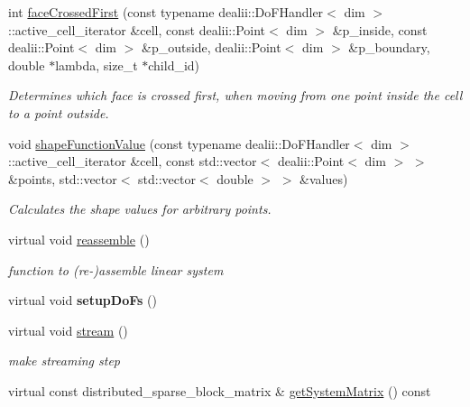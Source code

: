 \begin{DoxyCompactItemize}
int \hyperlink{classnatrium_1_1SemiLagrangian_a3b096afb85f7ea3782e03ba36b973088}{faceCrossedFirst} (const typename dealii::DoFHandler$<$ dim $>$::active\_\-cell\_\-iterator \&cell, const dealii::Point$<$ dim $>$ \&p\_\-inside, const dealii::Point$<$ dim $>$ \&p\_\-outside, dealii::Point$<$ dim $>$ \&p\_\-boundary, double $\ast$lambda, size\_\-t $\ast$child\_\-id)
\begin{DoxyCompactList}\small\item\em Determines which face is crossed first, when moving from one point inside the cell to a point outside. \item\end{DoxyCompactList}\item 
void \hyperlink{classnatrium_1_1SemiLagrangian_a108742ef40b532cb9e1e26384dafec94}{shapeFunctionValue} (const typename dealii::DoFHandler$<$ dim $>$::active\_\-cell\_\-iterator \&cell, const std::vector$<$ dealii::Point$<$ dim $>$ $>$ \&points, std::vector$<$ std::vector$<$ double $>$ $>$ \&values)
\begin{DoxyCompactList}\small\item\em Calculates the shape values for arbitrary points. \item\end{DoxyCompactList}\item 
\hypertarget{classnatrium_1_1SemiLagrangian_a7f08b1181db3c1d1f26ba0cac9210fbc}{
virtual void \hyperlink{classnatrium_1_1SemiLagrangian_a7f08b1181db3c1d1f26ba0cac9210fbc}{reassemble} ()}
\label{classnatrium_1_1SemiLagrangian_a7f08b1181db3c1d1f26ba0cac9210fbc}

\begin{DoxyCompactList}\small\item\em function to (re-\/)assemble linear system \item\end{DoxyCompactList}\item 
\hypertarget{classnatrium_1_1SemiLagrangian_a29408988807e9fbe24c8900c0e6bcf00}{
virtual void {\bfseries setupDoFs} ()}
\label{classnatrium_1_1SemiLagrangian_a29408988807e9fbe24c8900c0e6bcf00}

\item 
\hypertarget{classnatrium_1_1SemiLagrangian_abbaedf8c657aa964006a3bb193185559}{
virtual void \hyperlink{classnatrium_1_1SemiLagrangian_abbaedf8c657aa964006a3bb193185559}{stream} ()}
\label{classnatrium_1_1SemiLagrangian_abbaedf8c657aa964006a3bb193185559}

\begin{DoxyCompactList}\small\item\em make streaming step \item\end{DoxyCompactList}\item 
\hypertarget{classnatrium_1_1SemiLagrangian_ae8a21527f3ab056eab8b3b0af25a572c}{
virtual const distributed\_\-sparse\_\-block\_\-matrix \& \hyperlink{classnatrium_1_1SemiLagrangian_ae8a21527f3ab056eab8b3b0af25a572c}{getSystemMatrix} () const }
\label{classnatrium_1_1SemiLagrangian_ae8a21527f3ab056eab8b3b0af25a572c}


\end{DoxyCompactItemize}
